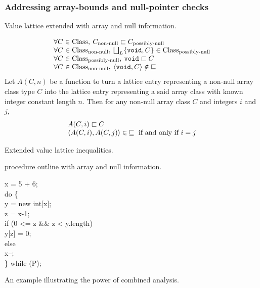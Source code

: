 \documentclass[12pt,titlepage,twoside]{article}
\newcommand{\figscale}{1.0}
\newcommand{\latlt}{\ensuremath{\sqsubset}}
\newcommand{\latleq}{\ensuremath{\sqsubseteq}}
\begin{document}
\subsubsection{Addressing array-bounds and null-pointer checks}
\begin{myfigure}
\centering\renewcommand{\figscale}{0.5}
\caption{Value lattice extended with array and null information.}
\label{fig:scclat5}
\end{myfigure}
\begin{myfigure}
\[\begin{array}{l}
\forall C \in \text{Class},\:
  C_{\text{non-null}} \latlt C_{\text{possibly-null}}\\
\forall C \in \text{Class}_{\text{non-null}},\:
  \bigsqcup_L \{\code{void},C\} \in \text{Class}_{\text{possibly-null}}\\
\forall C \in \text{Class}_{\text{possibly-null}},\:
  \code{void} \latlt C\\
\forall C \in \text{Class}_{\text{non-null}},\:
  \tuple{\code{void},C}\notin\:\latleq\\
\end{array}\]%
Let $A(C, n)$ be a
function to turn a lattice entry representing a non-null array class
type $C$ into the lattice entry representing a said array class with
known integer constant length $n$.  Then for any non-null array class
$C$ and integers $i$ and $j$,
\[\begin{array}{l}
A(C, i) \latlt C\\
\tuple{A(C, i), A(C, j)} \in\:\latleq \text{ if and only if } i=j\\
\end{array}\]%
\caption{Extended value lattice inequalities.}\label{fig:arraynull_rules}
\end{myfigure}
\begin{myalgorithm}\small

\caption{ procedure outline with array and null information.}
\label{alg:arraynull_scc}
\end{myalgorithm}
\begin{myfigure}
\begin{samplecode}
x = 5 + 6;\\
do \{\\
\>y = new int[x];\\
\>z = x-1;\\
\>if (0 <= z \&\& z < y.length)\\
\>\>y[z] = 0;\\
\>else\\
\>\>x--;\\
\} while (P);\\
\end{samplecode}
\caption{An example illustrating the power of combined analysis.}
\label{fig:combined}
\end{myfigure}
\end{document}
